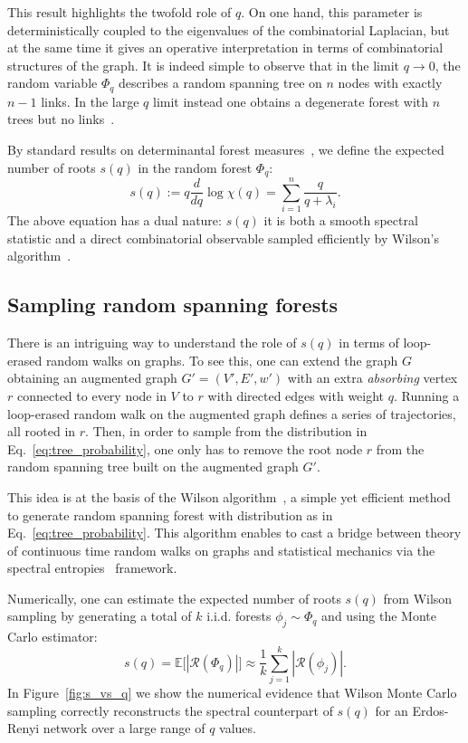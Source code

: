 \documentclass[10pt,aps,pre,twocolumn,nofootinbib,superscriptaddress,longbibliography]{revtex4-2}
\begin{document}
This result highlights the twofold role of $q$.
On one hand, this parameter is deterministically coupled to the eigenvalues of the combinatorial Laplacian, but at the same time it gives an operative interpretation in terms of combinatorial structures of the graph. It is indeed simple to observe that in the limit $q\to 0$, the random variable $\Phi_q$ describes a random spanning tree on $n$ nodes with exactly $n-1$ links.
In the large $q$ limit instead one obtains a degenerate forest with $n$ trees but no links~\cite{avena2018}.

By standard results on determinantal forest measures~\citep{hough2006determinantal,lyons2017probability,avena2018,avena2018a}, we define the expected number of roots $s(q)$ in the random forest $\Phi_q$:
\begin{equation}\label{eq:s_def}
s(q) := q\frac{d}{dq}\log\chi(q) = \sum_{i=1}^n \frac{q}{q+\lambda_i}.
\end{equation}
The above equation has a dual nature: $s(q)$ it is both a smooth spectral statistic and a direct combinatorial observable sampled efficiently by Wilson's algorithm~\cite{wilson1996,propp1998}.

\subsection{Sampling random spanning forests}
There is an intriguing way to understand the role of $s(q)$ in terms of loop-erased random walks on graphs.
To see this, one can extend the graph $G$ obtaining an augmented graph $G'=(V',E',w')$ with an extra \emph{absorbing} vertex $r$ connected to every node in $V$ to $r$ with directed edges with weight $q$.
Running a loop-erased random walk on the augmented graph defines a series of trajectories, all rooted in $r$.
Then, in order to sample from the distribution in Eq.~\ref{eq:tree_probability}, one only has to remove the root node $r$ from the random spanning tree built on the augmented graph $G'$.

This idea is at the basis of the Wilson algorithm~\cite{wilson1996,propp1998}, a simple yet efficient method to generate random spanning forest with distribution as in Eq.~\ref{eq:tree_probability}.
This algorithm enables to cast a bridge between theory of continuous time random walks on graphs and statistical mechanics via the spectral entropies~\cite{dedomenico2016b,ghavasieh2020statistical} framework.

Numerically, one can estimate the expected number of roots $s(q)$ from Wilson sampling by generating a total of $k$ i.i.d. forests $\phi_j \sim \Phi_q$ and using the Monte Carlo estimator:
\begin{equation}\label{eq:wilson_montecarlo}
	s(q) = \mathbb{E}\bigl[|\mathcal{R}(\Phi_q)|\bigr] \approx \frac{1}{k} \sum_{j=1}^{k} |\mathcal{R}(\phi_j)|.
\end{equation}
In Figure~\ref{fig:s_vs_q} we show the numerical evidence that Wilson Monte Carlo sampling correctly reconstructs the spectral counterpart of $s(q)$ for an Erdos-Renyi network over a large range of $q$ values.
\end{document}

